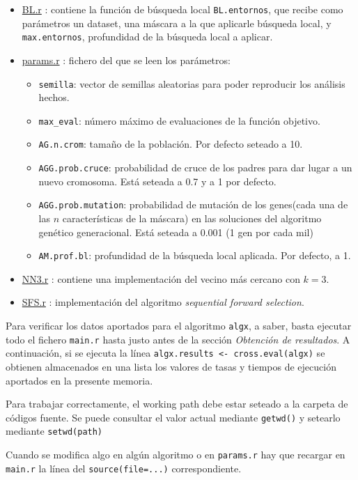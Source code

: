 \documentclass[a4paper,11pt]{article}
\newcommand{\hrefr}[1]{
\href{../bin/#1}{#1}
}
\begin{document}
\begin{itemize}
 \item \hrefr{BL.r}: contiene la función de búsqueda local \texttt{BL.entornos}, que recibe como parámetros un dataset,
 una máscara a la que aplicarle búsqueda local, y \texttt{max.entornos}, profundidad de la búsqueda local a aplicar.

 
 \item \hrefr{params.r}: fichero del que se leen los parámetros:
  \begin{itemize}
    \item \texttt{semilla}: vector de semillas aleatorias para poder reproducir los análisis hechos.
    \item \texttt{max\_eval}: número máximo de evaluaciones de la función objetivo.
    \item \texttt{AG.n.crom}: tamaño de la población. Por defecto seteado a 10.
    \item \texttt{AGG.prob.cruce}: probabilidad de cruce de los padres para dar lugar a un nuevo cromosoma. 
    Está seteada a 0.7 y a 1 por defecto.
    \item \texttt{AGG.prob.mutation}: probabilidad de mutación de los genes(cada una de las $n$ características
    de la máscara) en las soluciones del algoritmo genético generacional. Está seteada a 0.001 (1 gen por cada mil)
    \item \texttt{AM.prof.bl}: profundidad de la búsqueda local aplicada. Por defecto, a 1.
  \end{itemize}
  
 \item \hrefr{NN3.r}: contiene una implementación del vecino más cercano con $k=3$.
 \item \hrefr{SFS.r}: implementación del algoritmo \textit{sequential forward selection}.
 \end{itemize}
 
 Para verificar los datos aportados para el algoritmo \texttt{algx}, a saber, basta ejecutar todo el fichero \texttt{main.r}
 hasta justo antes de la sección \textit{Obtención de resultados}. A continuación, si se ejecuta la línea 
 \texttt{algx.results <- cross.eval(algx)} se obtienen almacenados en una lista los valores de tasas y tiempos de ejecución
 aportados en la presente memoria. 
 
 Para trabajar correctamente, el working path debe estar seteado a la carpeta de códigos fuente. Se puede consultar el 
 valor actual mediante \texttt{getwd()} y setearlo mediante \texttt{setwd(path)}
 
 Cuando se modifica algo en algún algoritmo o en \texttt{params.r} hay que recargar en \texttt{main.r}
 la línea del \texttt{source(file=...)} correspondiente.
 
\end{document}
